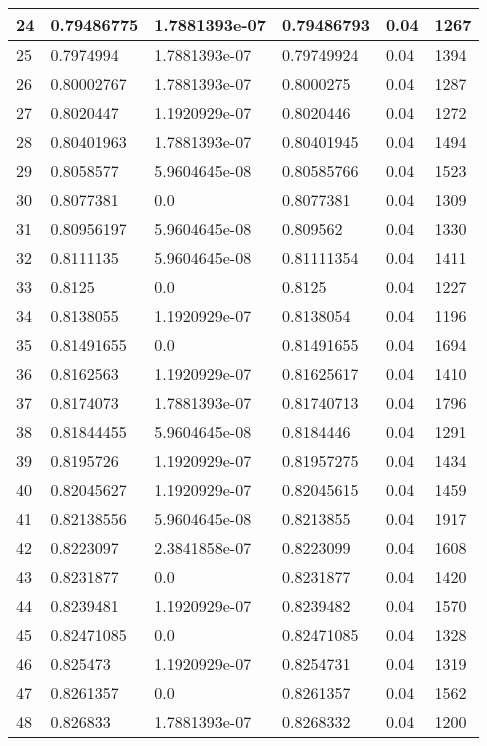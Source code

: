 \begin{longtable}{|l|l|l|l|l|l|}
24 & 0.79486775 & 1.7881393e-07 & 0.79486793 & 0.04 & 1267 \\ \hline 
25 & 0.7974994 & 1.7881393e-07 & 0.79749924 & 0.04 & 1394 \\ \hline 
26 & 0.80002767 & 1.7881393e-07 & 0.8000275 & 0.04 & 1287 \\ \hline 
27 & 0.8020447 & 1.1920929e-07 & 0.8020446 & 0.04 & 1272 \\ \hline 
28 & 0.80401963 & 1.7881393e-07 & 0.80401945 & 0.04 & 1494 \\ \hline 
29 & 0.8058577 & 5.9604645e-08 & 0.80585766 & 0.04 & 1523 \\ \hline 
30 & 0.8077381 & 0.0 & 0.8077381 & 0.04 & 1309 \\ \hline 
31 & 0.80956197 & 5.9604645e-08 & 0.809562 & 0.04 & 1330 \\ \hline 
32 & 0.8111135 & 5.9604645e-08 & 0.81111354 & 0.04 & 1411 \\ \hline 
33 & 0.8125 & 0.0 & 0.8125 & 0.04 & 1227 \\ \hline 
34 & 0.8138055 & 1.1920929e-07 & 0.8138054 & 0.04 & 1196 \\ \hline 
35 & 0.81491655 & 0.0 & 0.81491655 & 0.04 & 1694 \\ \hline 
36 & 0.8162563 & 1.1920929e-07 & 0.81625617 & 0.04 & 1410 \\ \hline 
37 & 0.8174073 & 1.7881393e-07 & 0.81740713 & 0.04 & 1796 \\ \hline 
38 & 0.81844455 & 5.9604645e-08 & 0.8184446 & 0.04 & 1291 \\ \hline 
39 & 0.8195726 & 1.1920929e-07 & 0.81957275 & 0.04 & 1434 \\ \hline 
40 & 0.82045627 & 1.1920929e-07 & 0.82045615 & 0.04 & 1459 \\ \hline 
41 & 0.82138556 & 5.9604645e-08 & 0.8213855 & 0.04 & 1917 \\ \hline 
42 & 0.8223097 & 2.3841858e-07 & 0.8223099 & 0.04 & 1608 \\ \hline 
43 & 0.8231877 & 0.0 & 0.8231877 & 0.04 & 1420 \\ \hline 
44 & 0.8239481 & 1.1920929e-07 & 0.8239482 & 0.04 & 1570 \\ \hline 
45 & 0.82471085 & 0.0 & 0.82471085 & 0.04 & 1328 \\ \hline 
46 & 0.825473 & 1.1920929e-07 & 0.8254731 & 0.04 & 1319 \\ \hline 
47 & 0.8261357 & 0.0 & 0.8261357 & 0.04 & 1562 \\ \hline 
48 & 0.826833 & 1.7881393e-07 & 0.8268332 & 0.04 & 1200 \\ \hline 

\end{longtable}
